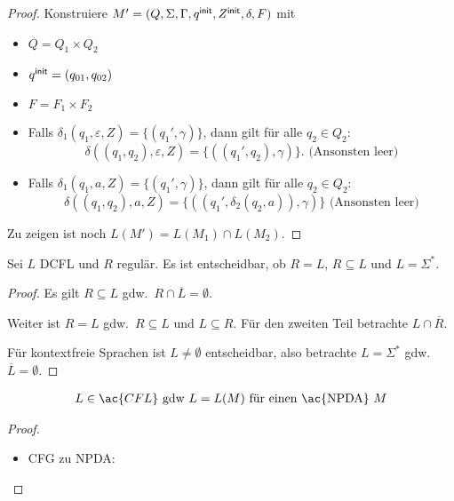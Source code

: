 {\begin{proof}
    Konstruiere $M'= (Q, \Sigma, \Gamma, q^\mathsf{init}, Z^\mathsf{init}, \delta, F)$ mit
    \begin{itemize}
    \item $Q = Q_1 \times Q_2$
    \item $q^\mathsf{init} = (q_{01}, q_{02})$
    \item $F = F_1  \times F_2$
    \item Falls $\delta_1 (q_1, \varepsilon, Z) = \{(q_1', \gamma)\}$, dann gilt für alle $q_2\in Q_2$: 
      \[ \delta ((q_1, q_2), \varepsilon, Z)
      = \{((q_1', q_2), \gamma)\} \text{.     (Ansonsten leer)} \]
    \item Falls $\delta_1 (q_1, a, Z) = \{(q_1', \gamma)\}$, dann gilt für alle $q_2\in Q_2$: 
      \[ \delta ((q_1, q_2), a, Z) =
      \{((q_1', \delta_2 (q_2, a)), \gamma)\} \text{   (Ansonsten leer)} \]
    \end{itemize}
    Zu zeigen ist noch $L (M') = L (M_1) \cap L (M_2)$.
\end{proof}
\begin{Satz}
    Sei $L$ DCFL und $R$ regulär.
    Es ist entscheidbar, ob $R=L$, $R\subseteq L$ und $L=\Sigma^*$.
\end{Satz}
\begin{proof}
    Es gilt $R\subseteq L$ gdw.\ $R \cap \overline{L} = \emptyset$.
    
    Weiter ist $R = L$ gdw.\ $R\subseteq L$ und $L \subseteq R$. Für den zweiten Teil betrachte $L\cap \overline{R}$.
    
    Für kontextfreie Sprachen ist $L\ne \emptyset$ entscheidbar, also betrachte $L=\Sigma^*$ gdw.\ $\overline{L}=\emptyset$.
\end{proof}















\begin{Satz}\label{satz:5.1}
  \begin{align*}
                L \in \ac{CFL}  \text{ gdw } L =L(M) \text{ für einen \ac{NPDA} $M$}
  \end{align*}
\end{Satz}
\begin{proof}\hfill
        \begin{itemize}
        \item \ac{CFG} zu \ac{NPDA}:



\end{itemize}
\end{proof}}

